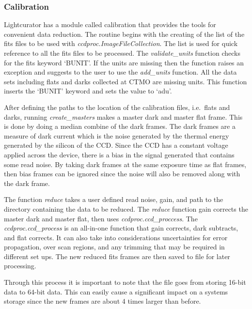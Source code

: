 \subsubsection{Calibration}
Lightcurator has a module called calibration that provides the tools for convenient data reduction.
The routine begins with the creating of the list of the fits files to be used
with \textit{ccdproc.ImageFileCollection}.
The list is used for quick reference to all the fits files to be processed.
The \textit{validate\_units} function checks for the fits keyword `BUNIT'. 
If the units are missing then the function raises an exception and suggests
to the user to use the \textit{add\_units} function. 
All the data sets including flats and darks collected at CTMO are missing units.
This function inserts the `BUNIT' keyword and sets the value to `adu'.

After defining the paths to the location of the calibration files, i.e.\
flats and darks, running \textit{create\_masters} makes a master dark and master flat frame.
This is done by doing a median combine of the dark frames. 
The dark frames are a measure of dark current which is the noise generated by the thermal energy generated by the silicon of the CCD\@.
Since the CCD has a constant voltage applied across the device, there is a bias in the signal generated that contains some read noise.
By taking dark frames at the same exposure time as flat frames, then bias frames can be ignored since the noise will also be removed along
with the dark frame.



The function \textit{reduce} takes a user defined read noise, gain, and
path to the directory containing the data to be reduced. 
The \textit{reduce} function gain corrects the master dark and master flat, then
uses \textit{ccdproc.ccd\_proccess}. 
The \textit{ccdproc.ccd\_process } is an all-in-one function that gain corrects,
dark subtracts, and flat corrects. It can also take into considerations 
uncertainties for error propagation, over scan regions, and any trimming that
may be required in different set ups.
The new reduced fits frames are then saved to file for later processing.

Through this process it is important to note that the file goes from storing
16-bit data to 64-bit data.
This can easily cause a significant impact on a systems storage
since the new frames are about 4 times larger than before.

